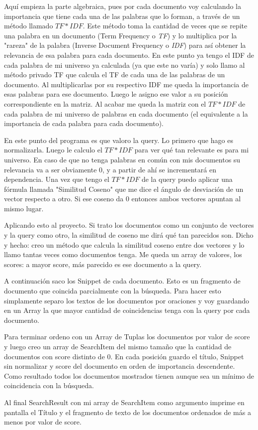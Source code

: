 \documentclass[12pt]{article}
\begin{document}
Aqu\'i empieza la parte algebraica, pues por cada documento voy calculando la importancia que tiene cada una de
las palabras que lo forman, a trav\'es de un m\'etodo llamado $TF*IDF$. Este m\'etodo toma la cantidad de veces 
que se repite una palabra en un documento (Term Frequency o \emph{TF}) y lo multiplica por la "rareza" de la palabra 
(Inverse Document Frequency o \emph{IDF}) para as\'i obtener la relevancia de esa palabra para cada documento. En este 
punto ya tengo el IDF de cada palabra de mi universo ya calculada (ya que este no var\'ia) y solo llamo al m\'etodo privado 
TF que calcula el TF de cada una de las palabras de un documento. Al multiplicarlas por su respectivo IDF
me queda la importancia de esas palabras para ese documento. Luego le asigno ese valor a su posici\'on correspondiente 
en la matriz. Al acabar me queda la matriz con el $TF*IDF$ de cada palabra de mi universo de palabras en cada 
documento (el equivalente a la importancia de cada palabra para cada documento).

En este punto del programa es que valoro la query. Lo primero que hago es normalizarla. Luego le calculo el
$TF*IDF$ para ver qu\'e tan relevante es para mi universo. En caso de que no tenga palabras en com\'un con mis
documentos su relevancia va a ser obviamente 0, y a partir de ah\'i se incrementar\'a en dependencia.
Una vez que tengo el $TF*IDF$ de la query puedo aplicar una f\'ormula llamada "Similitud Coseno" que me dice el
\'angulo de desviaci\'on de un vector respecto a otro. Si ese coseno da 0 entonces ambos vectores apuntan al mismo
lugar.

Aplicando esto al proyecto. Si trato los documentos como un conjunto de vectores y la query como otro, la similitud
de coseno me dir\'a qu\'e tan parecidos son. Dicho y hecho: creo un m\'etodo que calcula la similitud coseno entre dos
vectores y lo llamo tantas veces como documentos tenga. Me queda un array de valores, los scores: a mayor score,
m\'as parecido es ese documento a la query.

A continuaci\'on saco los Snippet de cada documento. Esto es un fragmento de documento que coincida
parcialmente con la b\'usqueda. Para hacer esto simplamente separo los textos de los documentos por oraciones y
voy guardando en un Array la que mayor cantidad de coincidencias tenga con la query por cada documento.


Para terminar ordeno con un Array de Tuplas los documentos por valor de score y luego creo un array de SearchItem del
mismo tama\~no que la cantidad de documentos con score distinto de 0. En cada posici\'on guardo el t\'itulo, Snippet
sin normalizar y score del documento en orden de importancia descendente. Como resultado todos los documentos
mostrados tienen aunque sea un m\'inimo de coincidencia con la b\'usqueda.

Al final SearchResult con mi array de SearchItem como argumento imprime en pantalla el T\'itulo y el fragmento de
texto de los documentos ordenados de m\'as a menos por valor de score.
\end{document}
